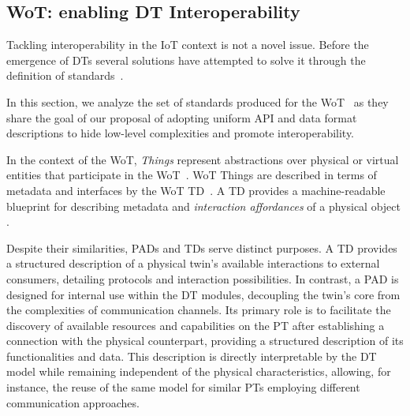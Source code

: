 \subsection{\acl{WoT}: enabling \ac{DT} Interoperability}
\label{sec:wot-dt-interop}

Tackling interoperability in the \ac{IoT} context is not a novel issue.
Before the emergence of \acp{DT} several solutions have attempted to solve it through the definition of standards~\cite{lee2021iot-interoperability-standards}.

In this section, we analyze the set of standards produced for the \ac{WoT}~\cite{wotarch} as they share the goal of our proposal of adopting uniform API and data format descriptions to hide low-level complexities and promote interoperability.

In the context of the \ac{WoT}, \textit{Things} represent abstractions over physical or virtual entities that participate in the \ac{WoT}~\cite{wotarch}.
\ac{WoT} Things are described in terms of metadata and interfaces by the \ac{WoT} \ac{TD}~\cite{wotthing}.
A \ac{TD} provides a machine-readable blueprint for describing metadata and \textit{interaction affordances} of a physical object \cite{wotthing}.

Despite their similarities, \acp{PAD} and \acp{TD} serve distinct purposes. 
A \ac{TD} provides a structured description of a physical twin's available interactions to external consumers, detailing protocols and interaction possibilities.
%
In contrast, a \ac{PAD} is designed for internal use within the \ac{DT} modules, decoupling the twin's core from the complexities of communication channels.
Its primary role is to facilitate the discovery of available resources and capabilities on the \ac{PT} after establishing a connection with the physical counterpart, providing a structured description of its functionalities and data.
This description is directly interpretable by the \ac{DT} model while remaining independent of the physical characteristics, allowing, for instance, the reuse of the same model for similar \acp{PT} employing different communication approaches.

